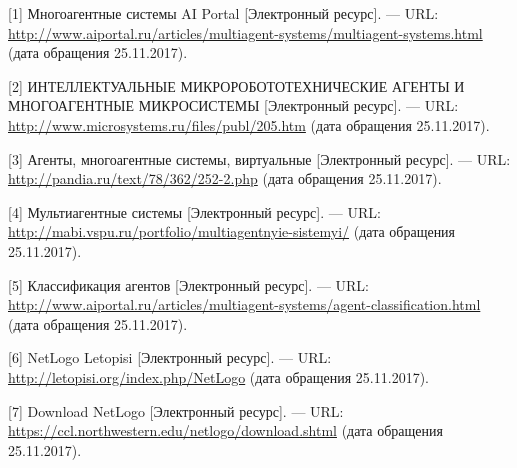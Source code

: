\documentclass[14pt,a4paper,report]{report}
\begin{document}
\begin{flushleft}
	
[1] Многоагентные системы AI Portal [Электронный ресурс]. — URL: \href{http://www.aiportal.ru/articles/multiagent-systems/multiagent-systems.html}{http://www.aiportal.ru/articles/multiagent-systems/multiagent-systems.html} (дата обращения 25.11.2017). \linebreak
	
[2] ИНТЕЛЛЕКТУАЛЬНЫЕ МИКРОРОБОТОТЕХНИЧЕСКИЕ АГЕНТЫ И МНОГОАГЕНТНЫЕ МИКРОСИСТЕМЫ [Электронный ресурс]. — URL: \href{http://www.microsystems.ru/files/publ/205.htm}{http://www.microsystems.ru/files/publ/205.htm} (дата обращения 25.11.2017). \linebreak

[3] Агенты, многоагентные системы, виртуальные [Электронный ресурс]. — URL: \href{http://pandia.ru/text/78/362/252-2.php}{http://pandia.ru/text/78/362/252-2.php} (дата обращения 25.11.2017). \linebreak

[4] Мультиагентные системы [Электронный ресурс]. — URL: \href{http://mabi.vspu.ru/portfolio/multiagentnyie-sistemyi/}{http://mabi.vspu.ru/portfolio/multiagentnyie-sistemyi/} (дата обращения 25.11.2017). \linebreak

[5] Классификация агентов [Электронный ресурс]. — URL: \href{http://www.aiportal.ru/articles/multiagent-systems/agent-classification.html}{http://www.aiportal.ru/articles/multiagent-systems/agent-classification.html} (дата обращения 25.11.2017). \linebreak

[6] NetLogo Letopisi [Электронный ресурс]. — URL: \href{http://letopisi.org/index.php/NetLogo}{http://letopisi.org/index.php/NetLogo} (дата обращения 25.11.2017). \linebreak

[7] Download NetLogo [Электронный ресурс]. — URL: \href{https://ccl.northwestern.edu/netlogo/download.shtml}{https://ccl.northwestern.edu/netlogo/download.shtml} (дата обращения 25.11.2017). \linebreak

\end{flushleft}
	
\end{document}
